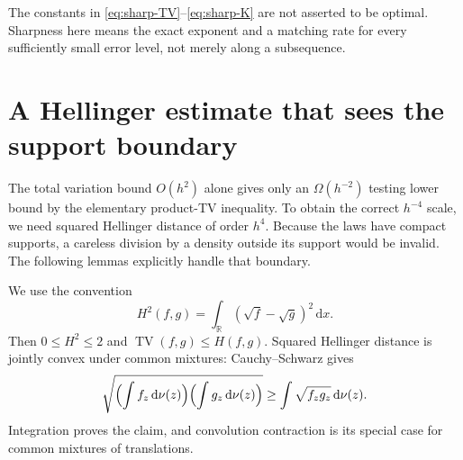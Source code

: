 \documentclass[11pt,a4paper]{article}
\numberwithin{equation}{section}
\theoremstyle{definition}
\theoremstyle{remark}
\DeclareMathOperator{\TV}{TV}
\newcommand{\R}{\mathbb R}
\newcommand{\dd}{\,\mathrm d}
\begin{document}
The constants in \eqref{eq:sharp-TV}--\eqref{eq:sharp-K} are not asserted
to be optimal. Sharpness here means the exact exponent and a matching rate
for every sufficiently small error level, not merely along a subsequence.

\section{A Hellinger estimate that sees the support boundary}
\label{sec:hellinger}

The total variation bound $O(h^2)$ alone gives only an $\Omega(h^{-2})$
testing lower bound by the elementary product-TV inequality. To obtain the
correct $h^{-4}$ scale, we need squared Hellinger distance of order $h^4$.
Because the laws have compact supports, a careless division by a density
outside its support would be invalid. The following lemmas explicitly handle
that boundary.

We use the convention
\begin{equation}
 H^2(f,g)=\int_\R(\sqrt f-\sqrt g)^2\dd x.
 \label{eq:hellinger-definition}
\end{equation}
Then $0\le H^2\le2$ and $\TV(f,g)\le H(f,g)$. Squared Hellinger distance
is jointly convex under common mixtures: Cauchy--Schwarz gives
\[
 \sqrt{\Bigl(\int f_z\dd\nu(z)\Bigr)
             \Bigl(\int g_z\dd\nu(z)\Bigr)}
 \ge\int\sqrt{f_zg_z}\dd\nu(z).
\]
Integration proves the claim, and convolution contraction is its special case
for common mixtures of translations.
\end{document}
